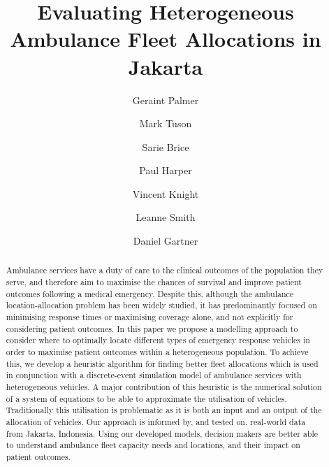 \documentclass[preprint,12pt]{elsarticle}
\begin{document}
\begin{frontmatter}


\title{Evaluating Heterogeneous Ambulance Fleet Allocations in Jakarta}

\author[inst1]{Geraint Palmer}
\author[inst1]{Mark Tuson}
\author[inst1]{Sarie Brice}
\author[inst1]{Paul Harper}
\author[inst1]{Vincent Knight}
\author[inst2]{Leanne Smith}
\author[inst1,inst3]{Daniel Gartner}


            



 \begin{abstract}
 Ambulance services have a duty of care to the clinical outcomes of the
 population they serve, and therefore aim to maximise the chances of survival
 and improve patient outcomes following a medical emergency. Despite this,
 although the ambulance location-allocation problem has been widely studied,
 it has predominantly focused on minimising response times or maximising
 coverage alone, and not explicitly for considering patient outcomes. In this
 paper we propose a modelling approach to consider where to optimally locate
 different types of emergency response vehicles in order to maximise patient
 outcomes within a heterogeneous population. To achieve this, we develop a
 heuristic algorithm for finding better fleet allocations which is used in
 conjunction with a discrete-event simulation model of ambulance services with
 heterogeneous vehicles. A major contribution of this heuristic is the numerical solution
 of a system of equations to be able to approximate the utilisation of
 vehicles. Traditionally this utilisation is problematic as it is both an
 input and an output of the allocation of vehicles.
 Our approach is informed by, and tested on,
 real-world data from Jakarta, Indonesia. Using our developed models, decision
 makers are better able to understand ambulance fleet capacity needs and
 locations, and their impact on patient outcomes.


\end{abstract}
\end{frontmatter}
\end{document}
